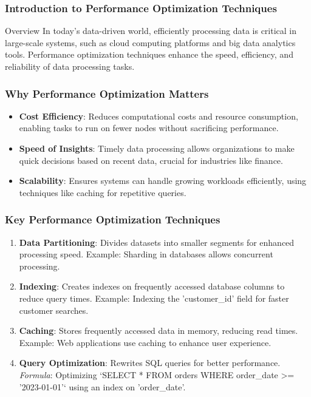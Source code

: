 \documentclass[aspectratio=169]{beamer}
\begin{document}
\frame{\titlepage}

\begin{frame}[fragile]
    \frametitle{Introduction to Performance Optimization Techniques}
    \begin{block}{Overview}
        In today's data-driven world, efficiently processing data is critical in large-scale systems, such as cloud computing platforms and big data analytics tools. Performance optimization techniques enhance the speed, efficiency, and reliability of data processing tasks.
    \end{block}
\end{frame}

\begin{frame}[fragile]
    \frametitle{Why Performance Optimization Matters}
    \begin{itemize}
        \item \textbf{Cost Efficiency}: Reduces computational costs and resource consumption, enabling tasks to run on fewer nodes without sacrificing performance.
        \item \textbf{Speed of Insights}: Timely data processing allows organizations to make quick decisions based on recent data, crucial for industries like finance.
        \item \textbf{Scalability}: Ensures systems can handle growing workloads efficiently, using techniques like caching for repetitive queries.
    \end{itemize}
\end{frame}

\begin{frame}[fragile]
    \frametitle{Key Performance Optimization Techniques}
    \begin{enumerate}
        \item \textbf{Data Partitioning}: Divides datasets into smaller segments for enhanced processing speed. Example: Sharding in databases allows concurrent processing.
        \item \textbf{Indexing}: Creates indexes on frequently accessed database columns to reduce query times. Example: Indexing the 'customer_id' field for faster customer searches.
        \item \textbf{Caching}: Stores frequently accessed data in memory, reducing read times. Example: Web applications use caching to enhance user experience.
        \item \textbf{Query Optimization}: Rewrites SQL queries for better performance. \textit{Formula}: Optimizing `SELECT * FROM orders WHERE order_date >= '2023-01-01'` using an index on 'order_date'.
    \end{enumerate}
\end{frame}
\end{document}
